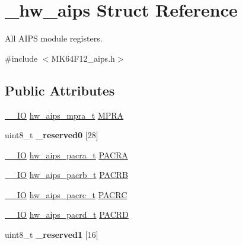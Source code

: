 \hypertarget{struct__hw__aips}{}\section{\+\_\+hw\+\_\+aips Struct Reference}
\label{struct__hw__aips}


All A\+I\+PS module registers.  




{\ttfamily \#include $<$M\+K64\+F12\+\_\+aips.\+h$>$}

\subsection*{Public Attributes}
\begin{DoxyCompactItemize}
\item 
\hyperlink{core__sc300_8h_aec43007d9998a0a0e01faede4133d6be}{\+\_\+\+\_\+\+IO} \hyperlink{union__hw__aips__mpra}{hw\+\_\+aips\+\_\+mpra\+\_\+t} \hyperlink{struct__hw__aips_a01d3ea1329e98e8e25706d64806f85cf}{M\+P\+RA}
\item 
uint8\+\_\+t {\bfseries \+\_\+reserved0} \mbox{[}28\mbox{]}\hypertarget{struct__hw__aips_a4da167620cfe9a1ded4c89071f28ad3f}{}\label{struct__hw__aips_a4da167620cfe9a1ded4c89071f28ad3f}

\item 
\hyperlink{core__sc300_8h_aec43007d9998a0a0e01faede4133d6be}{\+\_\+\+\_\+\+IO} \hyperlink{union__hw__aips__pacra}{hw\+\_\+aips\+\_\+pacra\+\_\+t} \hyperlink{struct__hw__aips_aeafe50f6e63f905450ede1b2da2a3ad5}{P\+A\+C\+RA}
\item 
\hyperlink{core__sc300_8h_aec43007d9998a0a0e01faede4133d6be}{\+\_\+\+\_\+\+IO} \hyperlink{union__hw__aips__pacrb}{hw\+\_\+aips\+\_\+pacrb\+\_\+t} \hyperlink{struct__hw__aips_ab8445998a229b89bbda4b6edcf406bc1}{P\+A\+C\+RB}
\item 
\hyperlink{core__sc300_8h_aec43007d9998a0a0e01faede4133d6be}{\+\_\+\+\_\+\+IO} \hyperlink{union__hw__aips__pacrc}{hw\+\_\+aips\+\_\+pacrc\+\_\+t} \hyperlink{struct__hw__aips_a160ef913a3002da852e368f5d54d52d0}{P\+A\+C\+RC}
\item 
\hyperlink{core__sc300_8h_aec43007d9998a0a0e01faede4133d6be}{\+\_\+\+\_\+\+IO} \hyperlink{union__hw__aips__pacrd}{hw\+\_\+aips\+\_\+pacrd\+\_\+t} \hyperlink{struct__hw__aips_abcaf27dba00b199b3bd2007042c16910}{P\+A\+C\+RD}
\item 
uint8\+\_\+t {\bfseries \+\_\+reserved1} \mbox{[}16\mbox{]}\hypertarget{struct__hw__aips_ae35b99ebaef6bd4c0b6af8d9cdd43ef2}{}\label{struct__hw__aips_ae35b99ebaef6bd4c0b6af8d9cdd43ef2}


\end{DoxyCompactItemize}
